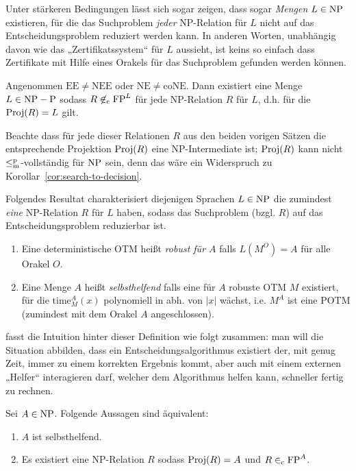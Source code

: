 Unter stärkeren Bedingungen lässt sich sogar zeigen, dass sogar \emph{Mengen} $L\in\mathrm{NP}$ existieren, für die das Suchproblem \emph{jeder} NP-Relation für $L$ nicht auf das Entscheidungsproblem reduziert werden kann. In anderen Worten, unabhängig davon wie das „Zertifikatssystem“ für $L$ aussieht, ist keins so einfach dass Zertifikate mit Hilfe eines Orakels für das Suchproblem gefunden werden können.

\begin{theorem}
Angenommen $\mathrm{EE\neq NEE}$ oder $\mathrm{NE\neq coNE}$. Dann existiert eine Menge $L\in\mathrm{NP}-\mathrm{P}$ sodass $R\not\in_\mathrm{c} \mathrm{FP}^L$ für jede NP-Relation $R$ für $L$, d.h. für die $\operatorname{Proj}(R)=L$ gilt.
\end{theorem}
Beachte dass für jede dieser Relationen $R$ aus den beiden vorigen Sätzen die entsprechende Projektion $\operatorname{Proj}(R)$ eine NP-Intermediate ist; $\operatorname{Proj}(R)$ kann nicht $\leq_\mathrm{m}^\mathrm{p}$-vollständig für $\mathrm{NP}$ sein, denn das wäre ein Widerspruch zu Korollar~\ref{cor:search-to-decision}.

Folgendes Resultat charakterisiert diejenigen Sprachen $L\in\mathrm{NP}$ die zumindest \emph{eine} NP-Relation $R$ für $L$ haben, sodass das Suchproblem (bzgl. $R$) auf das Entscheidungsproblem reduzierbar ist.
\begin{definition}
    \begin{enumerate}
        \item Eine deterministische OTM heißt \emph{robust für $A$} falls $L(M^O)=A$ für alle Orakel $O$.
        \item Eine Menge $A$ heißt \emph{selbsthelfend} falls eine für $A$ robuste OTM $M$ existiert, für die $\mathrm{time}_M^A(x)$ polynomiell in abh. von $|x|$ wächst, i.e. $M^A$ ist eine POTM (zumindest mit dem Orakel $A$ angeschlossen).\qedhere
    \end{enumerate}
\end{definition}
\citeauthor{balcazar_self_1989} fasst die Intuition hinter dieser Definition wie folgt zusammen: man will die Situation abbilden, dass ein Entscheidungsalgorithmus existiert der, mit genug Zeit, immer zu einem korrekten Ergebnis kommt, aber auch mit einem externen „Helfer“ interagieren darf, welcher dem Algorithmus helfen kann, schneller fertig zu rechnen.
\begin{theorem}
    Sei $A\in \mathrm{NP}$. Folgende Aussagen sind äquivalent:
    \begin{enumerate}
        \item $A$ ist selbsthelfend.
        \item Es existiert eine NP-Relation $R$ sodass $\operatorname{Proj}(R)=A$ und $R\in_\mathrm{c} \mathrm{FP}^{A}$.
    \end{enumerate}
\end{theorem}

